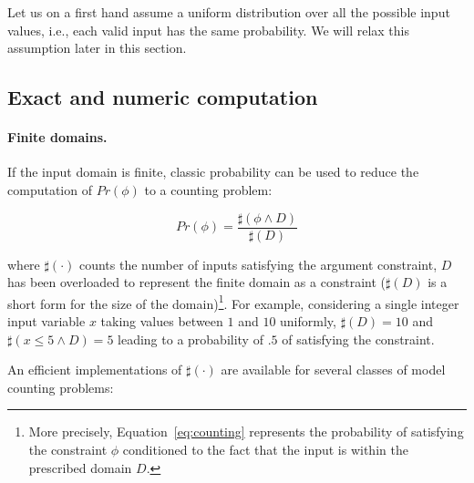 Let us on a first hand assume a uniform distribution over all the possible input values, i.e., each valid input has the same probability. We will relax this assumption later in this section. 


\subsection{Exact and numeric computation}\label{sec:computingprobabilitiesExact}

\paragraph{Finite domains.} 

If the input domain is finite, classic probability can be used to reduce the computation of $Pr(\phi)$ to a counting problem:

\begin{equation}\label{eq:counting}
	Pr(\phi) = \frac{\sharp(\phi \land D)}{\sharp(D)}
\end{equation}

\noindent where $\sharp(\cdot)$ counts the number of inputs satisfying the argument constraint, $D$ has been overloaded to represent the finite domain as a constraint ($\sharp(D)$ is a short form for the size of the domain)\footnote{More precisely, Equation~\eqref{eq:counting} represents the probability of satisfying the constraint $\phi$ conditioned to the fact that the input is within the prescribed domain $D$.}. For example, considering a single integer input variable $x$ taking values between $1$ and $10$ uniformly, $\sharp(D)=10$ and $\sharp(x\leq5 \land D)=5$ leading to a probability of $.5$ of satisfying the constraint.

An efficient implementations of $\sharp(\cdot)$ are available for several classes of model counting problems:

